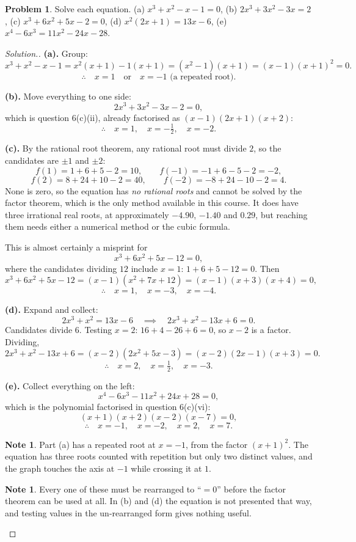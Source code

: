 \documentclass[11pt,a4paper]{article}
\theoremstyle{definition}
\newtheorem{note}[thm]{Note}
\newtheorem{problemx}{Problem}[section]
\newenvironment{problem}{\begin{problemx}}{\end{problemx}}
\newenvironment{solution}
  {\renewcommand{\qedsymbol}{}\begin{proof}[\textit{Solution}.]}
  {\end{proof}}
\begin{document}
\begin{problem}
Solve each equation.
\quad (a) $x^3+x^2-x-1=0$, \quad (b) $2x^3+3x^2-3x=2$, \quad
(c) $x^3+6x^2+5x-2=0$, \quad (d) $x^2(2x+1)=13x-6$, \quad
(e) $x^4-6x^3=11x^2-24x-28$.
\end{problem}

\begin{solution}
\textbf{(a).} Group:
$$x^3+x^2-x-1=x^2(x+1)-1(x+1)=\left(x^2-1\right)(x+1)=(x-1)(x+1)^2=0.$$
$$\therefore\quad x=1\quad\text{or}\quad x=-1 \text{ (a repeated root)}.$$

\textbf{(b).} Move everything to one side:
$$2x^3+3x^2-3x-2=0,$$
which is question 6(c)(ii), already factorised as $(x-1)(2x+1)(x+2)$:
$$\therefore\quad x=1,\quad x=-\tfrac{1}{2},\quad x=-2.$$

\textbf{(c).} By the rational root theorem, any rational root must divide $2$, so the
candidates are $\pm 1$ and $\pm 2$:
$$f(1)=1+6+5-2=10,\qquad f(-1)=-1+6-5-2=-2,$$
$$f(2)=8+24+10-2=40,\qquad f(-2)=-8+24-10-2=4.$$
None is zero, so the equation has \emph{no rational roots} and cannot be solved by the
factor theorem, which is the only method available in this course. It does have three
irrational real roots, at approximately $-4.90$, $-1.40$ and $0.29$, but reaching them
needs either a numerical method or the cubic formula.

This is almost certainly a misprint for
$$x^3+6x^2+5x-12=0,$$
where the candidates dividing $12$ include $x=1$: $1+6+5-12=0$. Then
$$x^3+6x^2+5x-12=(x-1)\left(x^2+7x+12\right)=(x-1)(x+3)(x+4)=0,$$
$$\therefore\quad x=1,\quad x=-3,\quad x=-4.$$

\textbf{(d).} Expand and collect:
$$2x^3+x^2=13x-6\quad\implies\quad 2x^3+x^2-13x+6=0.$$
Candidates divide $6$. Testing $x=2$: $16+4-26+6=0$, so $x-2$ is a factor. Dividing,
$$2x^3+x^2-13x+6=(x-2)\left(2x^2+5x-3\right)=(x-2)(2x-1)(x+3)=0.$$
$$\therefore\quad x=2,\quad x=\tfrac{1}{2},\quad x=-3.$$

\textbf{(e).} Collect everything on the left:
$$x^4-6x^3-11x^2+24x+28=0,$$
which is the polynomial factorised in question 6(c)(vi):
$$(x+1)(x+2)(x-2)(x-7)=0,$$
$$\therefore\quad x=-1,\quad x=-2,\quad x=2,\quad x=7.$$

\begin{note}
Part (a) has a repeated root at $x=-1$, from the factor $(x+1)^2$. The equation has
three roots counted with repetition but only two distinct values, and the graph touches
the axis at $-1$ while crossing it at $1$.
\end{note}

\begin{note}
Every one of these must be rearranged to ``$=0$'' before the factor theorem can be used
at all. In (b) and (d) the equation is not presented that way, and testing values in the
un-rearranged form gives nothing useful.
\end{note}
\end{solution}
\end{document}
